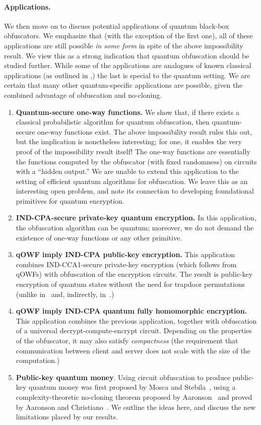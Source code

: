\documentclass[11pt]{article}
\numberwithin{equation}{section}
\begin{document}
{\paragraph{Applications.} We then move on to discuss potential applications of quantum black-box obfuscators. We emphasize that (with the exception of the first one), all of these applications are still possible \emph{in some form} in spite of the above impossibility result. We view this as a strong indication that quantum obfuscation should be studied further. While some of the applications are analogues of known classical applications (as outlined in \cite{BGIRSVY12},) the last is special to the quantum setting. We are certain that many other quantum-specific applications are possible, given the combined advantage of obfuscation and no-cloning.

\begin{enumerate}
\item \textbf{Quantum-secure one-way functions.} We show that, if there exists a classical probabilistic algorithm for quantum obfuscation, then quantum-secure one-way functions exist. The above impossibility result rules this out, but the implication is nonetheless interesting; for one, it enables the very proof of the impossibility result itself! The one-way functions are essentially the functions computed by the obfuscator (with fixed randomness) on circuits with a ``hidden output.'' We are unable to extend this application to the setting of efficient quantum algorithms for obfuscation. We leave this as an interesting open problem, and note its connection to developing foundational primitives for quantum encryption.
\item \textbf{IND-CPA-secure private-key quantum encryption.} In this application, the obfuscation algorithm can be quantum; moreover, we do not demand the existence of one-way functions or any other primitive.
\item \textbf{qOWF imply IND-CPA public-key encryption.} This application combines IND-CCA1-secure private-key encryption (which follows from qOWFs) with obfuscation of the encryption circuits. The result is public-key encryption of quantum states without the need for trapdoor permutations (unlike in~\cite{ABFGSS16} and, indirectly, in~\cite{BJ15}.)
\item \textbf{qOWF imply IND-CPA quantum fully homomorphic encryption.} This application combines the previous application, together with obfuscation of a universal decrypt-compute-encrypt circuit. Depending on the properties of the obfuscator, it may also satisfy \emph{compactness} (the requirement that communication between client and server does not scale with the size of the computation.)
\item \textbf{Public-key quantum money}. Using circuit obfuscation to produce public-key quantum money was first proposed by Mosca and Stebila~\cite{MS10}, using a complexity-theoretic no-cloning theorem proposed by Aaronson~\cite{Aar09} and proved by Aaronson and Christiano~\cite{AC12}. We outline the ideas here, and discuss the new limitations placed by our results.
\end{enumerate}

}
\end{document}
